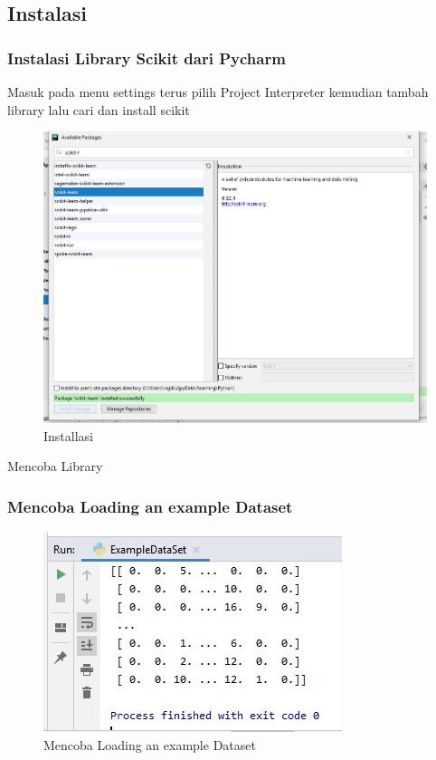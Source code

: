 \subsection{Instalasi}
\subsubsection{Instalasi Library Scikit dari Pycharm}
Masuk pada menu settings terus pilih Project Interpreter kemudian tambah library lalu cari dan install scikit
\begin{figure}[ht]
\centering
\includegraphics[scale=0.5]{figures/1174042/chapter1/2.jpg}
\caption{Installasi}
\label{contoh}
\end{figure}

Mencoba Library


\subsubsection{Mencoba Loading an example Dataset}

\begin{figure}[ht]
\centering
\includegraphics[scale=0.5]{figures/1174042/chapter1/3.jpg}
\caption{Mencoba Loading an example Dataset}
\label{contoh}
\end{figure}

